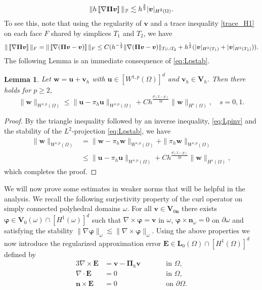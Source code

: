 \documentclass[10pt]{amsart}
\numberwithin{equation}{section}
\newtheorem{lemma}[theorem]{Lemma}
\theoremstyle{definition}
\theoremstyle{remark}
\renewcommand{\(}{\bigl(}
\renewcommand{\)}{\bigr)}
\newcommand{\jump}[1]{\left[\hspace{-0.025in}\left[#1\right]\hspace{-0.025in}\right]}
\newcommand{\bld}[1]{\boldsymbol{#1}}
\newcommand{\bv}{\bld{v}}
\newcommand{\bw}{\bld{w}}
\newcommand{\bn}{\bld{n}}
\newcommand{\bu}{\bld{u}}
\newcommand{\bE}{\bld{E}}
\newcommand{\bV}{\bld{V}}
\newcommand{\bPi}{\bld{\Pi}}
\newcommand{\bL}{\bld{L}}
\newcommand{\bvarphi}{\bm \varphi}
\begin{document}
\begin{equation}\label{eq:jump_bound}
\|h \jump{\nabla \bPi \bv}\|_{\mathcal{F}} \lesssim  h^{\frac32} |\bv|_{H^2(\Omega)}.
\end{equation}
To see this, note that
using the regularity of $\bv$ and a trace inequality \eqref{trace_H1} on each face $F$
shared by simplices $T_1$ and $T_2$, we have
\[
\|\jump{\nabla\bPi\bv}\|_{F} = \|\jump{\nabla(\bPi\bv - \bv)}\|_{F}
\leq C (h^{-\frac12} \|\nabla(\bPi\bv - \bv)\|_{T_1\cup T_2 }+
h^{\frac12} (|\bv|_{H^2(T_1)}+|\bv|_{H^2(T_2)})).
\]
 The following Lemma is an immediate consequence of \eqref{eq:Lpstab}.
\begin{lemma}\label{lem:lptol2}
Let $\bw = \bu + \bv_h$ with $\bu \in [W^{1,p}(\Omega)]^d$ and $\bv_h
\in \bV_h$. Then there holds for $p \ge 2$,
\[
\|\bw\|_{W^{s,p}(\Omega)} \leq \|\bu - \pi_h \bu\|_{W^{s,p}(\Omega)}
+ C h^{\frac{d(2-p)}{2p}} \|\bw\|_{H^s(\Omega)},\quad s=0,1.
\]
\end{lemma}
\begin{proof}
By the triangle inequality followed by an inverse inequality, \eqref{eq:Lpinv} and the stability of the
$L^2$-projection \eqref{eq:Lpstab}, we have
\begin{align*}
\|\bw\|_{W^{s,p}(\Omega)} &= \|\bw - \pi_h \bw\|_{W^{s,p}(\Omega)}
+\|\pi_h\bw\|_{W^{s,p}(\Omega)} 
\\
&\leq \|\bu - \pi_h \bu\|_{W^{s,p}(\Omega)}
+ C h^{\frac{d(2-p)}{2p}} \|\bw\|_{H^s(\Omega)},
\end{align*}
which completes the proof.
\end{proof}

We will now prove some estimates in weaker norms that will be helpful
in the analysis.
We recall the following surjectivity property of the curl
operator on simply connected polyhedral domains $\omega$. For all $\bv \in
\bV_{0\bn}$ there exists $\bvarphi\in \bV_0(\omega) \cap [H^1(\omega)]^d$ such
that $\nabla \times \bvarphi = \bv$ in $\omega$, $\bvarphi \times \bn_\omega = 0$
on $\partial \omega$ and satisfying the stability $\|\nabla
\bvarphi\|_\omega \lesssim \|\nabla \times
\bvarphi\|_\omega$. \cite[Theorem 3.17]{ABDG98}
Using the above properties we now introduce the regularized approximation error $\bE \in \bL_0(\Omega) \cap [H^1(\Omega)]^d$ defined by
\begin{alignat}{3}\label{eq:E1_Omega}
\nabla \times \bE &= \bv - \bPi_h \bv &\qquad & \mbox{in } \Omega,
\\
\nabla \cdot \bE & =0 &\qquad &  \mbox{in } \Omega, 
\\
\bn \times \bE & = 0 &\qquad & \mbox{on } \partial \Omega. \label{eq:E3_Omega}
\end{alignat}
\end{document}

